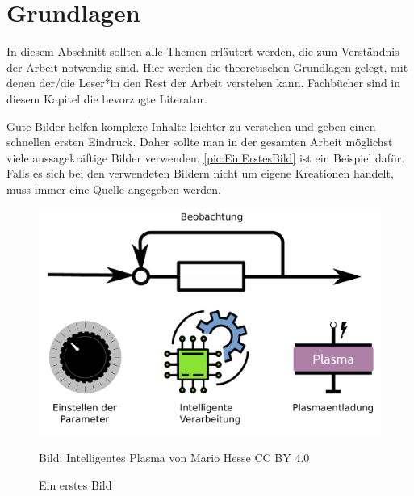 

\clearpage

\section{Grundlagen}

In diesem Abschnitt sollten alle Themen erläutert werden, die zum Verständnis der Arbeit notwendig sind. Hier werden die theoretischen Grundlagen gelegt, mit denen der/die Leser*in den Rest der Arbeit verstehen kann. Fachbücher \citep{Helmke2016,Metelmann2016} sind in diesem Kapitel die bevorzugte Literatur. 

Gute Bilder helfen komplexe Inhalte leichter zu verstehen und geben einen schnellen ersten Eindruck. Daher sollte man in der gesamten Arbeit möglichst viele aussagekräftige Bilder verwenden. \autoref{pic:EinErstesBild} ist ein Beispiel dafür. Falls es sich bei den verwendeten Bildern nicht um eigene Kreationen handelt, muss immer eine Quelle angegeben werden.

\begin{figure}[htbp]
	\centering
	\includegraphics[width=0.5\linewidth]{pic/IntelligentesPlasma.pdf}
	\caption{Ein erstes Bild}
	{\scriptsize Bild: \glqq Intelligentes Plasma\grqq{} von Mario Hesse CC BY 4.0}
	\label{pic:EinErstesBild}
\end{figure}
